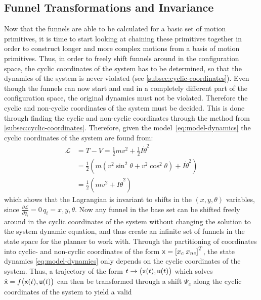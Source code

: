 \subsection{Funnel Transformations and Invariance}
\label{subsec:shifting-funnels}

Now that the funnels are able to be calculated for a basic set of motion
primitives, it is time to start looking at chaining these primitives together in
order to construct longer and more complex motions from a basis of motion
primitives. Thus, in order to freely shift funnels around in the configuration
space, the cyclic coordinates of the system has to be determined, so that the
dynamics of the system is never violated (see \cref{subsec:cyclic-coordinates}).
Even though the funnels can now start and end in a completely different part of
the configuration space, the original dynamics must not be violated. Therefore
the cyclic and non-cyclic coordinates of the system must be decided. This is
done through finding the cyclic and non-cyclic coordinates through the method
from \cref{subsec:cyclic-coordinates}. Therefore, given the
model~\cref{eq:model-dynamics} the cyclic coordinates of the system are found
from:
\begin{align*}
  \mathcal{L} &= T - V = \frac{1}{2} mv^2 + \frac{1}{2}I\dot{\theta}^2 \\ 
              &= \frac{1}{2} \left(  m \left(
                v^2 \sin^2 \theta + v^2 \cos^2 \theta
                \right)  + I {\dot{\theta}}^2 \right) \\
              &= \frac{1}{2} \left(  mv^2 + I {\dot{\theta}}^2 \right)
\end{align*}
which shows that the Lagrangian is invariant to shifts in the \((x,y,\theta)\)
variables, since \(\frac{\partial\mathcal{L}}{\partial q_i} = 0 \, q_i =
x,y,\theta\). Now any funnel in the base set can be shifted freely around in the
cyclic coordinates of the system without changing the solution to the system
dynamic equation, and thus create an infinite set of funnels in the state space
for the planner to work with. Through the partitioning of coordinates into
cyclic- and non-cyclic coordinates of the form \({\mathbf{\mathsf{x}}} = \left[ x_c\; x_{nc}
\right]^{T }\), the state dynamics \cref{eq:model-dynamics} only depends on the
cyclic coordinates of the system. Thus, a trajectory of the form \(t \rightarrow
\bigl( {\mathbf{\mathsf{x}}}(t), {\mathbf{\mathsf{u}}}(t) \bigr) \) which solves \(\dot{{\mathbf{\mathsf{x}}}} = f
\bigl({\mathbf{\mathsf{x}}}(t), {\mathbf{\mathsf{u}}}(t) \bigl) \) can then be transformed through a shift
\(\Psi_{c}\) along the cyclic coordinates of the system to yield a valid
